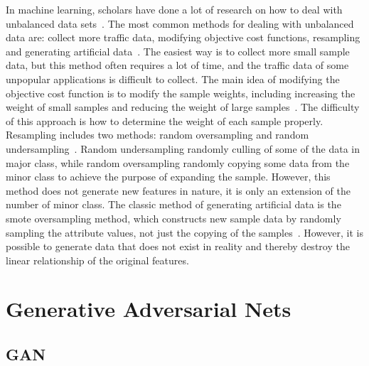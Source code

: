 \documentclass[conference]{IEEEtran}
\begin{document}
In machine learning, scholars have done a lot of research on how to deal with unbalanced data sets~\cite{r14,r15,r16}. The most common methods for dealing with unbalanced data are: collect more traffic data, modifying objective cost functions, resampling and generating artificial data~\cite{r13}. The easiest way is to collect more small sample data, but this method often requires a lot of time, and the traffic data of some unpopular applications is difficult to collect. The main idea of modifying the objective cost function is to modify the sample weights, including increasing the weight of small samples and reducing the weight of large samples~\cite{r17}. The difficulty of this approach is how to determine the weight of each sample properly. Resampling includes two methods: random oversampling and random undersampling~\cite{r19}. Random undersampling randomly culling of some of the data in major class, while random oversampling randomly copying some data from the minor class to achieve the purpose of expanding the sample. However, this method does not generate new features in nature, it is only an extension of the number of minor class. The classic method of generating artificial data is the smote oversampling method, which constructs new sample data by randomly sampling the attribute values, not just the copying of the samples~\cite{r20}. However, it is possible to generate data that does not exist in reality and thereby destroy the linear relationship of the original features.

\section{Generative Adversarial Nets}\label{gan}

\subsection{GAN}\label{AA}

\end{document}
